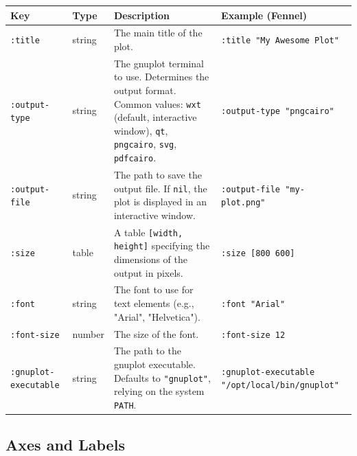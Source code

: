\documentclass[12pt, letterpaper]{article}
\begin{document}
	\begin{table}[htbp]
		\centering
		\begin{tabularx}{\textwidth}{l l X X}
			\toprule
			\textbf{Key} & \textbf{Type} & \textbf{Description} & \textbf{Example (Fennel)} \\
			\midrule
			\texttt{:title} & string & The main title of the plot. & \texttt{:title "My Awesome Plot"} \\
			\texttt{:output-type} & string & The gnuplot terminal to use. Determines the output format. Common values: \texttt{wxt} (default, interactive window), \texttt{qt}, \texttt{pngcairo}, \texttt{svg}, \texttt{pdfcairo}. & \texttt{:output-type "pngcairo"} \\
			\texttt{:output-file} & string & The path to save the output file. If \texttt{nil}, the plot is displayed in an interactive window. & \texttt{:output-file "my-plot.png"} \\
			\texttt{:size} & table & A table \texttt{[width, height]} specifying the dimensions of the output in pixels. & \texttt{:size [800 600]} \\
			\texttt{:font} & string & The font to use for text elements (e.g., "Arial", "Helvetica"). & \texttt{:font "Arial"} \\
			\texttt{:font-size} & number & The size of the font. & \texttt{:font-size 12} \\
			\texttt{:gnuplot-executable} & string & The path to the gnuplot executable. Defaults to \texttt{"gnuplot"}, relying on the system \texttt{PATH}. & \texttt{:gnuplot-executable "/opt/local/bin/gnuplot"} \\
			\bottomrule
		\end{tabularx}
	\end{table}
	
	\subsection{Axes and Labels}
	
\end{document}
